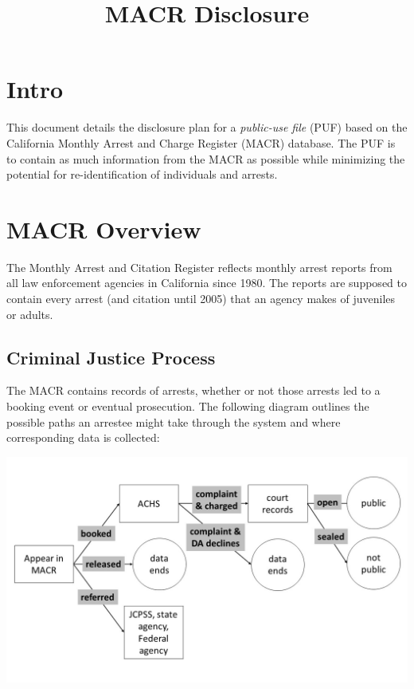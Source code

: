 \documentclass[]{article}
\title{MACR Disclosure}
\author{}
\date{}
\begin{document}
\maketitle

\section{Intro}\label{intro}

This document details the disclosure plan for a \emph{public-use file}
(PUF) based on the California Monthly Arrest and Charge Register (MACR)
database. The PUF is to contain as much information from the MACR as
possible while minimizing the potential for re-identification of
individuals and arrests.

\section{MACR Overview}\label{macr-overview}

The Monthly Arrest and Citation Register reflects monthly arrest reports
from all law enforcement agencies in California since 1980. The reports
are supposed to contain every arrest (and citation until 2005) that an
agency makes of juveniles or adults.

\subsection{Criminal Justice Process}\label{criminal-justice-process}

The MACR contains records of arrests, whether or not those arrests led
to a booking event or eventual prosecution. The following diagram
outlines the possible paths an arrestee might take through the system
and where corresponding data is collected:

\begin{center}
  \includegraphics{img/arrestFlowchart.jpg}
\end{center}
\end{document}
